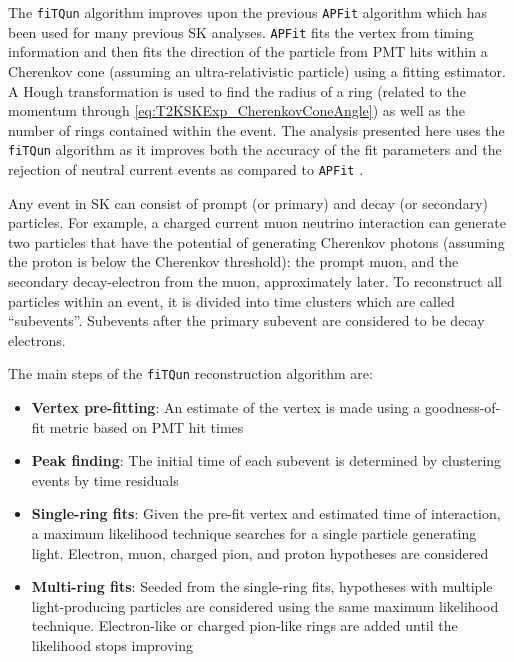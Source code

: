 The \texttt{fiTQun} algorithm improves upon the previous \texttt{APFit} algorithm \cite{Shiozawa1999} which has been used for many previous SK analyses. \texttt{APFit} fits the vertex from timing information and then fits the direction of the particle from PMT hits within a \quickmath{43\deg} Cherenkov cone (assuming an ultra-relativistic particle) using a fitting estimator. A Hough transformation is used to find the radius of a ring (related to the momentum through \autoref{eq:T2KSKExp_CherenkovConeAngle}) as well as the number of rings contained within the event. The analysis presented here uses the \texttt{fiTQun} algorithm as it improves both the accuracy of the fit parameters and the rejection of neutral current  events as compared to \texttt{APFit} \cite{Abe2018, Abe2015}.

Any event in SK can consist of prompt (or primary) and decay (or secondary) particles. For example, a charged current muon neutrino interaction can generate two particles that have the potential of generating Cherenkov photons (assuming the proton is below the Cherenkov threshold): the prompt muon, and the secondary decay-electron from the muon, approximately  later. To reconstruct all particles within an event, it is divided into time clusters which are called ``subevents''. Subevents after the primary subevent are considered to be decay electrons.

The main steps of the \texttt{fiTQun} reconstruction algorithm are:

\begin{itemize}
\item \textbf{Vertex pre-fitting}: An estimate of the vertex is made using a goodness-of-fit metric based on PMT hit times
\item \textbf{Peak finding}: The initial time of each subevent is determined by clustering events by time residuals
\item \textbf{Single-ring fits}: Given the pre-fit vertex and estimated time of interaction, a maximum likelihood technique searches for a single particle generating light. Electron, muon, charged pion, and proton hypotheses are considered
\item \textbf{Multi-ring fits}: Seeded from the single-ring fits, hypotheses with multiple light-producing particles are considered using the same maximum likelihood technique. Electron-like or charged pion-like rings are added until the likelihood stops improving
\end{itemize}

